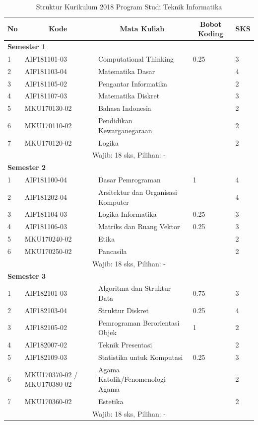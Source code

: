 \begin{table}[H]
	\centering
		\caption{Struktur Kurikulum 2018 Program Studi Teknik Informatika}
		\begin{tabular}{|p{0.5cm}|p{2.85cm}|p{4.95cm}|p{2.7cm}|p{2.7cm}|}
			\hline
			\multicolumn{1}{|c|}{\textbf{No}} & \multicolumn{1}{c|}{\textbf{Kode}} & \multicolumn{1}{c|}{\textbf{Mata Kuliah}} & \multicolumn{1}{c|}{\textbf{Bobot Koding}} & \multicolumn{1}{c|}{\textbf{SKS}} \\ \hline
			\multicolumn{5}{|l|}{\textbf{Semester 1}} \\ \hline
			1 &	AIF181101-03 &	Computational Thinking &	0.25 &	3   \\ \hline
			2 &	AIF181103-04 &	Matematika Dasar &	&	4  \\ \hline
			3 &	AIF181105-02 &	Pengantar Informatika &  & 2  \\ \hline
			4	& AIF181107-03 &	Matematika Diskret &	&	3  \\ \hline
			5	& MKU170130-02 &	Bahasa Indonesia &	&	2  \\ \hline
			6	& MKU170110-02 &	Pendidikan Kewarganegaraan &	&	2  \\ \hline
			7	& MKU170120-02 &	Logika &	&	2  \\ \hline
			\multicolumn{5}{|c|}{Wajib: 18 sks, Pilihan: -} \\ \hline
			\multicolumn{5}{|l|}{\textbf{Semester 2}} \\ \hline
			1 &	AIF181100-04 &	Dasar Pemrograman &	1 &	4 \\ \hline
			2 &	AIF181202-04 &	Arsitektur dan Organisasi Komputer & &	4  \\ \hline
			3 &	AIF181104-03 &	Logika Informatika &	0.25 &	3  \\ \hline
			4 &	AIF181106-03 &	Matriks dan Ruang Vektor &	0.25 &	3  \\ \hline
			5 &	MKU170240-02 &	Etika	& &	2  \\ \hline
			6 &	MKU170250-02 &	Pancasila & &	2  \\ \hline
			\multicolumn{5}{|c|}{Wajib: 18 sks, Pilihan: - }\\ \hline
			\multicolumn{5}{|l|}{\textbf{Semester 3}} \\ \hline
			1 &	AIF182101-03 &	Algoritma dan Struktur Data &	0.75 &	3  \\ \hline
			2 &	AIF182103-04 &	Struktur Diskret &	0.25 &	4  \\ \hline
			3 &	AIF182105-02 &	Pemrograman Berorientasi Objek &	1 &	2   \\ \hline
			4 &	AIF182007-02 &	Teknik Presentasi &  &	2  \\ \hline
			5 &	AIF182109-03 &	Statistika untuk Komputasi &	0.25 &	3  \\ \hline
			6 &	MKU170370-02 / MKU170380-02 &	Agama Katolik/Fenomenologi Agama & &	2  \\ \hline
			7 &	MKU170360-02 &	Estetika & &	2  \\ \hline
			\multicolumn{5}{|c|}{Wajib: 18 sks, Pilihan: -} \\ \hline
		\end{tabular}
	\label{tab:strukturkurikulum2018}
\end{table}

